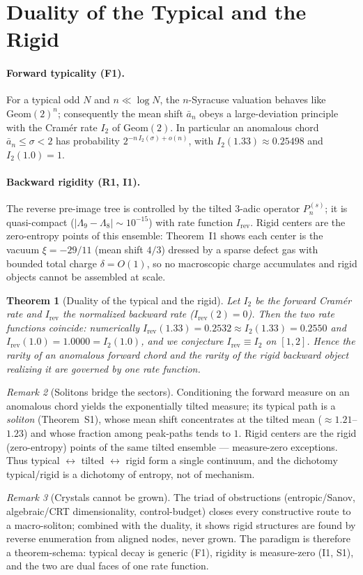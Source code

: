 \documentclass[12pt,a4paper]{article}
\newtheorem{theorem}{Theorem}[section]
\theoremstyle{remark}
\newtheorem{remark}[theorem]{Remark}
\begin{document}
\section{Duality of the Typical and the Rigid}
\paragraph{Forward typicality (F1).} For a typical odd $N$ and $n\ll\log N$,
the $n$-Syracuse valuation behaves like $\mathrm{Geom}(2)^n$; consequently the
mean shift $\bar a_n$ obeys a large-deviation principle with the Cram\'er rate
$I_2$ of $\mathrm{Geom}(2)$. In particular an anomalous chord
$\bar a_n\le\sigma<2$ has probability $2^{-n\,I_2(\sigma)+o(n)}$, with
$I_2(1.33)\approx0.25498$ and $I_2(1.0)=1$.
\paragraph{Backward rigidity (R1, I1).} The reverse pre-image tree is
controlled by the tilted $3$-adic operator $P_n^{(s)}$; it is quasi-compact
($|\Lambda_9-\Lambda_8|\sim10^{-15}$) with rate function $I_{\mathrm{rev}}$.
Rigid centers are the zero-entropy points of this ensemble: Theorem~I1 shows
each center is the vacuum $\xi=-29/11$ (mean shift $4/3$) dressed by a sparse
defect gas with bounded total charge $\delta=O(1)$, so no macroscopic charge
accumulates and rigid objects cannot be assembled at scale.
\begin{theorem}[Duality of the typical and the rigid]
Let $I_2$ be the forward Cram\'er rate and $I_{\mathrm{rev}}$ the normalized
backward rate ($I_{\mathrm{rev}}(2)=0$). Then the two rate functions coincide:
numerically $I_{\mathrm{rev}}(1.33)=0.2532\approx I_2(1.33)=0.2550$ and
$I_{\mathrm{rev}}(1.0)=1.0000=I_2(1.0)$, and we conjecture
$I_{\mathrm{rev}}\equiv I_2$ on $[1,2]$. Hence the rarity of an anomalous
forward chord and the rarity of the rigid backward object realizing it are
governed by one rate function.
\end{theorem}
\begin{remark}[Solitons bridge the sectors]
Conditioning the forward measure on an anomalous chord yields the exponentially
tilted measure; its typical path is a \emph{soliton} (Theorem~S1), whose mean
shift concentrates at the tilted mean ($\approx1.21$--$1.23$) and whose
fraction among peak-paths tends to $1$. Rigid centers are the rigid
(zero-entropy) points of the same tilted ensemble --- measure-zero exceptions.
Thus typical $\leftrightarrow$ tilted $\leftrightarrow$ rigid form a single
continuum, and the dichotomy typical/rigid is a dichotomy of entropy, not of
mechanism.
\end{remark}
\begin{remark}[Crystals cannot be grown]
The triad of obstructions (entropic/Sanov, algebraic/CRT dimensionality,
control-budget) closes every constructive route to a macro-soliton; combined
with the duality, it shows rigid structures are found by reverse enumeration
from aligned nodes, never grown. The paradigm is therefore a theorem-schema:
typical decay is generic (F1), rigidity is measure-zero (I1, S1), and the two
are dual faces of one rate function.
\end{remark}
\end{document}
